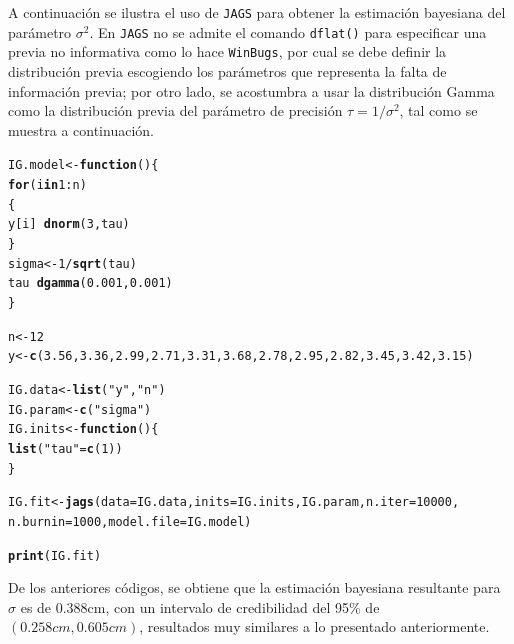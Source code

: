 \documentclass[10pt,openright]{book}\usepackage[]{graphicx}\usepackage[]{color}
\makeatletter
\newcommand{\hlnum}[1]{\textcolor[rgb]{0.686,0.059,0.569}{#1}}%
\newcommand{\hlstr}[1]{\textcolor[rgb]{0.192,0.494,0.8}{#1}}%
\newcommand{\hlopt}[1]{\textcolor[rgb]{0,0,0}{#1}}%
\newcommand{\hlstd}[1]{\textcolor[rgb]{0.345,0.345,0.345}{#1}}%
\newcommand{\hlkwa}[1]{\textcolor[rgb]{0.161,0.373,0.58}{\textbf{#1}}}%
\newcommand{\hlkwb}[1]{\textcolor[rgb]{0.69,0.353,0.396}{#1}}%
\newcommand{\hlkwc}[1]{\textcolor[rgb]{0.333,0.667,0.333}{#1}}%
\newcommand{\hlkwd}[1]{\textcolor[rgb]{0.737,0.353,0.396}{\textbf{#1}}}%
\newenvironment{kframe}{%
 \def\at@end@of@kframe{}%
 \ifinner\ifhmode%
  \def\at@end@of@kframe{\end{minipage}}%
  \begin{minipage}{\columnwidth}%
 \fi\fi%
 \def\FrameCommand##1{\hskip\@totalleftmargin \hskip-\fboxsep
 \colorbox{shadecolor}{##1}\hskip-\fboxsep
     \hskip-\linewidth \hskip-\@totalleftmargin \hskip\columnwidth}%
 \MakeFramed {\advance\hsize-\width
   \@totalleftmargin\z@ \linewidth\hsize
   \@setminipage}}%
 {\par\unskip\endMakeFramed%
 \at@end@of@kframe}
\newenvironment{knitrout}{}{} %
\makeatother
\begin{document}
\begin{Eje}
    A continuaci\'on se ilustra el uso de \verb'JAGS' para obtener la estimaci\'on bayesiana del par\'ametro $\sigma^2$. En \verb'JAGS' no se admite el comando \verb'dflat()' para especificar una previa no informativa como lo hace \verb'WinBugs', por cual se debe definir la distribuci\'on previa escogiendo los par\'ametros que representa la falta de informaci\'on previa; por otro lado, se acostumbra a usar la distribuci\'on Gamma como la distribuci\'on previa del par\'ametro de precisi\'on $\tau=1/\sigma^2$, tal como se muestra a continuaci\'on.
    
\begin{knitrout}
\color{fgcolor}\begin{kframe}
\begin{alltt}
\hlstd{IG.model} \hlkwb{<-} \hlkwa{function}\hlstd{()\{}
\hlkwa{for}\hlstd{(i} \hlkwa{in} \hlnum{1} \hlopt{:} \hlstd{n)}
\hlstd{\{}
   \hlstd{y[i]} \hlopt{~} \hlkwd{dnorm}\hlstd{(}\hlnum{3}\hlstd{, tau)}
\hlstd{\}}
  \hlstd{sigma} \hlkwb{<-} \hlnum{1}\hlopt{/}\hlkwd{sqrt}\hlstd{(tau)}
  \hlstd{tau} \hlopt{~} \hlkwd{dgamma}\hlstd{(}\hlnum{0.001}\hlstd{,} \hlnum{0.001}\hlstd{)}
\hlstd{\}}

\hlstd{n} \hlkwb{<-} \hlnum{12}
\hlstd{y} \hlkwb{<-} \hlkwd{c}\hlstd{(}\hlnum{3.56}\hlstd{,} \hlnum{3.36}\hlstd{,} \hlnum{2.99}\hlstd{,} \hlnum{2.71}\hlstd{,} \hlnum{3.31}\hlstd{,} \hlnum{3.68}\hlstd{,} \hlnum{2.78}\hlstd{,} \hlnum{2.95}\hlstd{,} \hlnum{2.82}\hlstd{,} \hlnum{3.45}\hlstd{,} \hlnum{3.42}\hlstd{,} \hlnum{3.15}\hlstd{)}

\hlstd{IG.data} \hlkwb{<-} \hlkwd{list}\hlstd{(}\hlstr{"y"}\hlstd{,}\hlstr{"n"}\hlstd{)}
\hlstd{IG.param} \hlkwb{<-} \hlkwd{c}\hlstd{(}\hlstr{"sigma"}\hlstd{)}
\hlstd{IG.inits} \hlkwb{<-} \hlkwa{function}\hlstd{()\{}
  \hlkwd{list}\hlstd{(}\hlstr{"tau"}\hlstd{=}\hlkwd{c}\hlstd{(}\hlnum{1}\hlstd{))}
\hlstd{\}}

\hlstd{IG.fit} \hlkwb{<-} \hlkwd{jags}\hlstd{(}\hlkwc{data}\hlstd{=IG.data,} \hlkwc{inits}\hlstd{=IG.inits, IG.param,} \hlkwc{n.iter}\hlstd{=}\hlnum{10000}\hlstd{,}
    \hlkwc{n.burnin}\hlstd{=}\hlnum{1000}\hlstd{,} \hlkwc{model.file}\hlstd{=IG.model)}

\hlkwd{print}\hlstd{(IG.fit)}
\end{alltt}
\end{kframe}
\end{knitrout}
    
    De los anteriores c\'odigos, se obtiene que la estimaci\'on bayesiana resultante para $\sigma$ es de 0.388cm, con un intervalo de credibilidad del 95\% de $(0.258cm,0.605cm)$, resultados muy similares a lo presentado anteriormente. 
\end{Eje}
\end{document}
